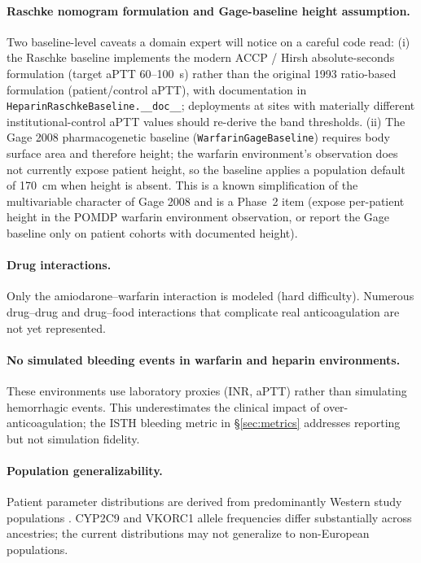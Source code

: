 \documentclass[11pt]{article}
\begin{document}
\paragraph{Raschke nomogram formulation and Gage-baseline height assumption.} Two baseline-level caveats a domain expert will notice on a careful code read: (i) the Raschke baseline implements the modern ACCP / Hirsh absolute-seconds formulation (target aPTT 60--100~s) rather than the original 1993 ratio-based formulation (patient/control aPTT), with documentation in \texttt{HeparinRaschkeBaseline.\_\_doc\_\_}; deployments at sites with materially different institutional-control aPTT values should re-derive the band thresholds. (ii) The Gage 2008 pharmacogenetic baseline (\texttt{WarfarinGageBaseline}) requires body surface area and therefore height; the warfarin environment's observation does not currently expose patient height, so the baseline applies a population default of 170~cm when height is absent. This is a known simplification of the multivariable character of Gage 2008 and is a Phase~2 item (expose per-patient height in the POMDP warfarin environment observation, or report the Gage baseline only on patient cohorts with documented height).

\paragraph{Drug interactions.} Only the amiodarone--warfarin interaction is modeled (hard difficulty). Numerous drug--drug and drug--food interactions that complicate real anticoagulation are not yet represented.

\paragraph{No simulated bleeding events in warfarin and heparin environments.} These environments use laboratory proxies (INR, aPTT) rather than simulating hemorrhagic events. This underestimates the clinical impact of over-anticoagulation; the ISTH bleeding metric in \S\ref{sec:metrics} addresses reporting but not simulation fidelity.

\paragraph{Population generalizability.} Patient parameter distributions are derived from predominantly Western study populations \citep{iwpc2009, hamberg2007}. CYP2C9 and VKORC1 allele frequencies differ substantially across ancestries; the current distributions may not generalize to non-European populations.
\end{document}
